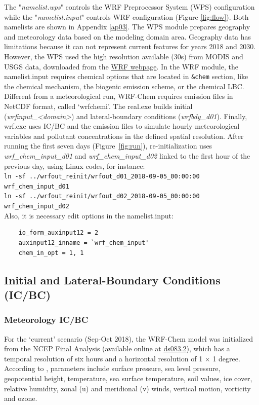 The "{\it namelist.wps}" controls the WRF Preprocessor System (WPS) configuration while the "{\it namelist.input}" controls WRF configuration (Figure \ref{fig:flow}).
Both namelists are shown in Appendix \ref{ap03}.
The WPS module prepares geography and meteorology data based on the modeling domain area.
Geography data has limitations because it can not represent current features for years 2018 and 2030.
However, the WPS used the high resolution available (30s) from MODIS and USGS data, downloaded from the \href{https://www2.mmm.ucar.edu/wrf/users/download/get_sources_wps_geog.html}{WRF webpage}.
In the WRF module, the namelist.input requires chemical options that are located in \verb|&chem| section, like the chemical mechanism, the biogenic emission scheme, or the chemical LBC. 
Different from a meteorological run, WRF-Chem requires emission files in NetCDF format, called `wrfchemi'.
The real.exe builds initial ({\it wrfinput\_<domain>}) and lateral-boundary conditions ({\it wrfbdy\_d01}).
Finally, wrf.exe uses IC/BC and the emission files to simulate hourly meteorological variables and pollutant concentrations in the defined spatial resolution.
 After running the first seven days (Figure~\ref{fig:run}), re-initialization uses {\it wrf\_chem\_input\_d01} and {\it wrf\_chem\_input\_d02} linked to the first hour of the previous day, using Linux codes, for instance:
  \\ \verb|ln -sf ../wrfout_reinit/wrfout_d01_2018-09-05_00:00:00 wrf_chem_input_d01|\\
  \verb|ln -sf ../wrfout_reinit/wrfout_d02_2018-09-05_00:00:00 wrf_chem_input_d02|\\
 Also, it is necessary edit options in the namelist.input:
 \begin{verbatim}
 	io_form_auxinput12 = 2
 	auxinput12_inname = `wrf_chem_input'
 	chem_in_opt = 1, 1
 \end{verbatim}
	
	
	\subsection{Initial and Lateral-Boundary Conditions (IC/BC)}
	
		\subsubsection{Meteorology IC/BC}
		For the `current' scenario (Sep-Oct 2018), the WRF-Chem model was initialized from the NCEP Final Analysis (available online at \href{https://rda.ucar.edu/datasets/ds083.2/}{ds083.2}), which has a temporal resolution of six hours and a horizontal resolution of 1 $\times$ 1 degree.
		According to \cite{NCEP2000}, parameters include surface pressure, sea level pressure, geopotential height, temperature, sea surface temperature, soil values, ice cover, relative humidity, zonal (u) and meridional (v) winds, vertical motion, vorticity and ozone.
		

